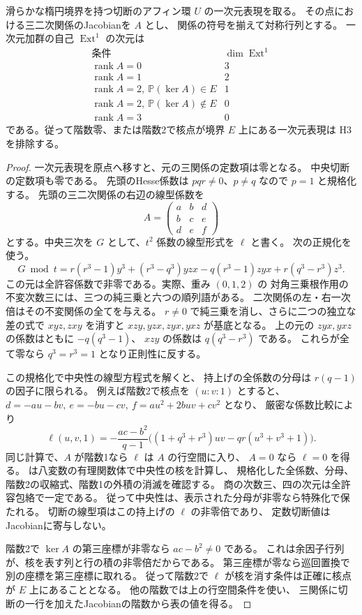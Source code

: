 \begin{theorem}[一次元表現の自己拡大と境界楕円曲線]
\label{thm:cubic-CY-three-alpha-elliptic-character-boundary}
滑らかな楕円境界を持つ切断のアフィン環 $U$ の一次元表現を取る。
その点における三二次関係のJacobianを $A$ とし、
関係の符号を揃えて対称行列とする。
一次元加群の自己 $\operatorname{Ext}^1$ の次元は
\[
\begin{array}{c|c}
\text{条件}&\dim\operatorname{Ext}^1\\ \hline
\operatorname{rank} A=0&3\\
\operatorname{rank} A=1&2\\
\operatorname{rank} A=2,\ \mathbb P(\ker A)\in E&1\\
\operatorname{rank} A=2,\ \mathbb P(\ker A)\notin E&0\\
\operatorname{rank} A=3&0
\end{array}
\]
である。従って階数零、または階数2で核点が境界 $E$ 上にある一次元表現は
H3を排除する。
\end{theorem}
\begin{proof}
一次元表現を原点へ移すと、元の三関係の定数項は零となる。
中央切断の定数項も零である。
先頭のHesse係数は $pqr\ne0$、$p\ne q$ なので $p=1$ と規格化する。
先頭の三二次関係の右辺の線型係数を
\[
 A=\begin{pmatrix}a&b&d\\b&c&e\\d&e&f\end{pmatrix}
\]
とする。中央三次を $G$ として、$t^2$ 係数の線型形式を $\ell$ と書く。
次の正規化を使う。
\[
 G\bmod t
 =r(r^3-1)y^3+(r^3-q^3)yzx-q(r^3-1)zyx+r(q^3-r^3)z^3 .
\]
この元は全許容係数で非零である。実際、重み $(0,1,2)$ の
対角三乗根作用の不変次数三には、三つの純三乗と六つの順列語がある。
二次関係の左・右一次倍はその不変関係の全てを与える。
$r\ne0$ で純三乗を消し、さらに二つの独立な差の式で
$xyz,zxy$ を消すと $xzy,yzx,zyx,yxz$ が基底となる。
上の元の $zyx,yxz$ の係数はともに $-q(q^3-1)$、
$xzy$ の係数は $q(q^3-r^3)$ である。
これらが全て零なら $q^3=r^3=1$ となり正則性に反する。

この規格化で中央性の線型方程式を解くと、
持上げの全係数の分母は $r(q-1)$ の因子に限られる。
例えば階数2で核点を $(u:v:1)$ とすると、
$d=-au-bv,\ e=-bu-cv,\ f=au^2+2buv+cv^2$ となり、
厳密な係数比較により
\[
 \ell(u,v,1)=-\frac{ac-b^2}{q-1}
 \bigl((1+q^3+r^3)uv-qr(u^3+v^3+1)\bigr).
\]
同じ計算で、$A$ が階数1なら $\ell$ は $A$ の行空間に入り、
$A=0$ なら $\ell=0$ を得る。
は八変数の有理関数体で中央性の核を計算し、
規格化した全係数、分母、階数2の収縮式、階数1の外積の消滅を確認する。
商の次数三、四の次元は全許容包絡で一定である。
従って中央性は、表示された分母が非零なら特殊化で保たれる。
切断の線型項はこの持上げの $\ell$ の非零倍であり、
定数切断値はJacobianに寄与しない。

階数2で $\ker A$ の第三座標が非零なら $ac-b^2\ne0$ である。
これは余因子行列が、核を表す列と行の積の非零倍だからである。
第三座標が零なら巡回置換で別の座標を第三座標に取れる。
従って階数2で $\ell$ が核を消す条件は正確に核点が $E$ 上にあることとなる。
他の階数では上の行空間条件を使い、
三関係に切断の一行を加えたJacobianの階数から表の値を得る。
\end{proof}

